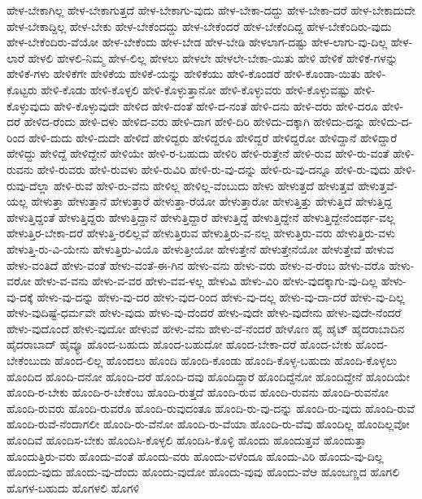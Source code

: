 {ಹೇಳ-ಬೇಕಾಗಿಲ್ಲ
ಹೇಳ-ಬೇಕಾಗುತ್ತದೆ
ಹೇಳ-ಬೇಕಾಗು-ವುದು
ಹೇಳ-ಬೇಕಾ-ದದ್ದು
ಹೇಳ-ಬೇಕಾ-ದರೆ
ಹೇಳ-ಬೇಕಾದುದೇ
ಹೇಳ-ಬೇಕಾದ್ದಿಲ್ಲ
ಹೇಳ-ಬೇಕು
ಹೇಳ-ಬೇಕೆಂದದ್ದು
ಹೇಳ-ಬೇಕೆಂದರೆ
ಹೇಳ-ಬೇಕೆಂದಿದ್ದ
ಹೇಳ-ಬೇಕೆಂದಿರು-ವುದು
ಹೇಳ-ಬೇಕೆಂದಿರು-ವೆಯೋ
ಹೇಳ-ಬೇಕೆಂದು
ಹೇಳ-ಬೇಡ
ಹೇಳ-ಬೇಡಿ
ಹೇಳಲಾಗ-ದಷ್ಟು
ಹೇಳ-ಲಾಗು-ವು-ದಿಲ್ಲ
ಹೇಳ-ಲಾರೆ
ಹೇಳಲಿ
ಹೇಳಲಿ-ನಿಮ್ಮ
ಹೇಳ-ಲಿಲ್ಲ
ಹೇಳಲು
ಹೇಳಲೇ
ಹೇಳಲೇ-ಬೇಕಾ-ಯಿತು
ಹೇಳಿ
ಹೇಳಿಕೆ
ಹೇಳಿಕೆ-ಗಳನ್ನು
ಹೇಳಿಕೆ-ಗಳು
ಹೇಳಿಕೆಗೇ
ಹೇಳಿಕೆಯ
ಹೇಳಿಕೆ-ಯನ್ನು
ಹೇಳಿಕೆಯು
ಹೇಳಿ-ಕೊಂಡರೆ
ಹೇಳಿ-ಕೊಂಡಾ-ಯಿತು
ಹೇಳಿ-ಕೊಟ್ಟರು
ಹೇಳಿ-ಕೊಡು
ಹೇಳಿ-ಕೊಳ್ಳಲಿ
ಹೇಳಿ-ಕೊಳ್ಳುತ್ತಾನೋ
ಹೇಳಿ-ಕೊಳ್ಳುವರು
ಹೇಳಿ-ಕೊಳ್ಳುವಷ್ಟು
ಹೇಳಿ-ಕೊಳ್ಳುವುದು
ಹೇಳಿ-ಕೊಳ್ಳುವುದೇ
ಹೇಳಿದ
ಹೇಳಿ-ದಂತೆ
ಹೇಳಿ-ದ-ನಂತೆ
ಹೇಳಿ-ದನು
ಹೇಳಿ-ದರು
ಹೇಳಿ-ದರೂ
ಹೇಳಿ-ದರೆ
ಹೇಳಿದ-ರೆಂದು
ಹೇಳಿ-ದಳು
ಹೇಳಿದ-ವರು
ಹೇಳಿ-ದಾಗ
ಹೇಳಿ-ದಿರಿ
ಹೇಳಿದು-ದಕ್ಕಾಗಿ
ಹೇಳಿದು-ದನ್ನು
ಹೇಳಿದು-ದ-ರಿಂದ
ಹೇಳಿ-ದುದು
ಹೇಳಿ-ದುದೇ
ಹೇಳಿದೆ
ಹೇಳಿದ್ದರು
ಹೇಳಿದ್ದರೂ
ಹೇಳಿದ್ದರೆ
ಹೇಳಿದ್ದರೋ
ಹೇಳಿದ್ದಾನೆ
ಹೇಳಿದ್ದಾರೆ
ಹೇಳಿದ್ದು
ಹೇಳಿದ್ದೆ
ಹೇಳಿದ್ದೇನೆ
ಹೇಳಿಯೇ
ಹೇಳಿ-ರ-ಬಹುದು
ಹೇಳಿರಿ
ಹೇಳಿ-ರುತ್ತೇನೆ
ಹೇಳಿ-ರುವ
ಹೇಳಿ-ರು-ವಂತೆ
ಹೇಳಿ-ರುವನು
ಹೇಳಿ-ರುವರು
ಹೇಳಿ-ರುವಳು
ಹೇಳಿ-ರುವಿರಿ
ಹೇಳಿ-ರು-ವು-ದನ್ನು
ಹೇಳಿ-ರು-ವು-ದನ್ನೂ
ಹೇಳಿ-ರು-ವುದು
ಹೇಳಿ-ರುವು-ದೆಲ್ಲಾ
ಹೇಳಿ-ರುವೆ
ಹೇಳಿ-ರು-ವೆನು
ಹೇಳಿಲ್ಲ
ಹೇಳಿಲ್ಲ-ವೆಂಬುದು
ಹೇಳು
ಹೇಳುತ್ತದೆ
ಹೇಳುತ್ತವೆ
ಹೇಳುತ್ತವೆ-ಯಲ್ಲ
ಹೇಳುತ್ತಾ
ಹೇಳುತ್ತಾನೆ
ಹೇಳುತ್ತಾರೆ
ಹೇಳುತ್ತಾ-ರೆಯೋ
ಹೇಳುತ್ತಾರೋ
ಹೇಳುತ್ತಿತ್ತು
ಹೇಳುತ್ತಿದೆ
ಹೇಳುತ್ತಿದ್ದ
ಹೇಳುತ್ತಿದ್ದಂತೆ
ಹೇಳುತ್ತಿದ್ದರು
ಹೇಳುತ್ತಿದ್ದಾನೆ
ಹೇಳುತ್ತಿದ್ದಾರೆ
ಹೇಳುತ್ತಿದ್ದೆ
ಹೇಳುತ್ತಿದ್ದೇನೆ
ಹೇಳುತ್ತಿದ್ದೇನೆಂದರ್ಥ-ವಲ್ಲ
ಹೇಳುತ್ತಿರ-ಬೇಕಾ-ದರೆ
ಹೇಳುತ್ತಿ-ರಲಿಲ್ಲವೆ
ಹೇಳುತ್ತಿರುವ
ಹೇಳುತ್ತಿರು-ವ-ನಲ್ಲ
ಹೇಳುತ್ತಿರು-ವರು
ಹೇಳುತ್ತಿರು-ವಳು
ಹೇಳುತ್ತಿ-ರು-ವಿ-ಯೇನು
ಹೇಳುತ್ತಿರು-ವಿಯೊ
ಹೇಳುತ್ತೀಯೋ
ಹೇಳುತ್ತೇನೆ
ಹೇಳುತ್ತೇನೆಯೋ
ಹೇಳುತ್ತೇವೆ
ಹೇಳುವ
ಹೇಳು-ವಂತಿದೆ
ಹೇಳು-ವಂತೆ
ಹೇಳು-ವಂತೆ-ಈ-ಗಿನ
ಹೇಳು-ವನು
ಹೇಳು-ವರು
ಹೇಳು-ವ-ರೆಂಬ
ಹೇಳು-ವರೊ
ಹೇಳು-ವರೋ
ಹೇಳು-ವ-ವನು
ಹೇಳು-ವ-ವರ
ಹೇಳು-ವವ-ಳಲ್ಲ
ಹೇಳುವಿ
ಹೇಳು-ವಿರಿ
ಹೇಳು-ವುದಕ್ಕಾಗು-ವು-ದಿಲ್ಲ
ಹೇಳು-ವು-ದಕ್ಕೆ
ಹೇಳು-ವು-ದನ್ನು
ಹೇಳು-ವು-ದರ
ಹೇಳು-ವುದ-ರಿಂದ
ಹೇಳು-ವು-ದಲ್ಲ
ಹೇಳು-ವು-ದಾ-ದರೆ
ಹೇಳು-ವು-ದಿಲ್ಲ
ಹೇಳು-ವುದಿಷ್ಟೆ-ಧರ್ಮವೇ
ಹೇಳು-ವುದು
ಹೇಳು-ವು-ದೆಂದರೆ
ಹೇಳು-ವುದೇ
ಹೇಳು-ವುದೇನು
ಹೇಳು-ವುದೇ-ನೆಂದರೆ
ಹೇಳು-ವುದೊಂದೆ
ಹೇಳು-ವುದೋ
ಹೇಳುವೆ
ಹೇಳು-ವೆನು
ಹೇಳು-ವೆ-ನೆಂದರೆ
ಹೇಳೊಣ
ಹೈ
ಹೈಟ್
ಹೈದರಾಬಾದಿನ
ಹೈದರಾಬಾದ್
ಹೈವ್ಯೂ
ಹೊಂದ-ಬಹುದು
ಹೊಂದ-ಬಹುದೋ
ಹೊಂದ-ಬೇಕಾ-ದರೆ
ಹೊಂದ-ಬೇಕು
ಹೊಂದ-ಬೇಕೆಂಬುದು
ಹೊಂದ-ಲಿಲ್ಲ
ಹೊಂದಲು
ಹೊಂದಿ
ಹೊಂದಿ-ಕೊಂಡು
ಹೊಂದಿ-ಕೊಳ್ಳ-ಬಹುದು
ಹೊಂದಿ-ಕೊಳ್ಳಲು
ಹೊಂದಿದ
ಹೊಂದಿ-ದನೋ
ಹೊಂದಿ-ದರೆ
ಹೊಂದಿ-ದವು
ಹೊಂದಿದ್ದಾರೆ
ಹೊಂದಿದ್ದೆನೋ
ಹೊಂದಿದ್ದೇನೆ
ಹೊಂದಿಯೇ
ಹೊಂದಿ-ರ-ಬೇಕು
ಹೊಂದಿ-ರ-ಬೇಕೆಂಬ
ಹೊಂದಿ-ರುತ್ತದೆ
ಹೊಂದಿ-ರುವ
ಹೊಂದಿ-ರುವನು
ಹೊಂದಿ-ರುವನೋ
ಹೊಂದಿ-ರುವರು
ಹೊಂದಿ-ರುವರೊ
ಹೊಂದಿ-ರುವುದಂತೂ
ಹೊಂದಿ-ರು-ವು-ದನ್ನು
ಹೊಂದಿ-ರು-ವುದು
ಹೊಂದಿ-ರುವೆ
ಹೊಂದಿ-ರುವೆ-ನೆಂದಾಗಲೀ
ಹೊಂದಿ-ರು-ವೆನೋ
ಹೊಂದಿ-ರು-ವೆಯಾ
ಹೊಂದಿ-ರು-ವೆವು
ಹೊಂದಿಲ್ಲ
ಹೊಂದಿಲ್ಲವೋ
ಹೊಂದಿವೆ
ಹೊಂದಿಸ-ಬೇಕು
ಹೊಂದಿಸಿ-ಕೊಳ್ಳಲಿ
ಹೊಂದಿಸಿ-ಕೊಳ್ಳಿ
ಹೊಂದು
ಹೊಂದುತ್ತವೆ
ಹೊಂದುತ್ತಾ
ಹೊಂದುತ್ತಿರು-ವರು
ಹೊಂದು-ವಂತೆ
ಹೊಂದು-ವರು
ಹೊಂದು-ವಳೆಂದೂ
ಹೊಂದು-ವಿರಿ
ಹೊಂದು-ವು-ದಿಲ್ಲ
ಹೊಂದು-ವುದು
ಹೊಂದು-ವು-ದೆಂದು
ಹೊಂದು-ವುದೋ
ಹೊಂದು-ವುವು
ಹೊಂದು-ವೆಆ
ಹೊಂಬಣ್ಣದ
ಹೊಗಲಿ
ಹೊಗಳ-ಬಹುದು
ಹೊಗಳಲಿ
ಹೊಗಳಿ
}
